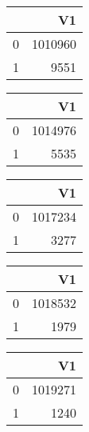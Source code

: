 \bigskip\bigskip
\centering
\begin{tabular}{rr}
  \hline
 & V1 \\ 
  \hline
0 & 1010960 \\ 
  1 & 9551 \\ 
   \hline
\end{tabular}

\bigskip\bigskip
\centering
\begin{tabular}{rr}
  \hline
 & V1 \\ 
  \hline
0 & 1014976 \\ 
  1 & 5535 \\ 
   \hline
\end{tabular}

\bigskip\bigskip
\centering
\begin{tabular}{rr}
  \hline
 & V1 \\ 
  \hline
0 & 1017234 \\ 
  1 & 3277 \\ 
   \hline
\end{tabular}

\bigskip\bigskip
\centering
\begin{tabular}{rr}
  \hline
 & V1 \\ 
  \hline
0 & 1018532 \\ 
  1 & 1979 \\ 
   \hline
\end{tabular}

\bigskip\bigskip
\centering
\begin{tabular}{rr}
  \hline
 & V1 \\ 
  \hline
0 & 1019271 \\ 
  1 & 1240 \\ 
   \hline
\end{tabular}

